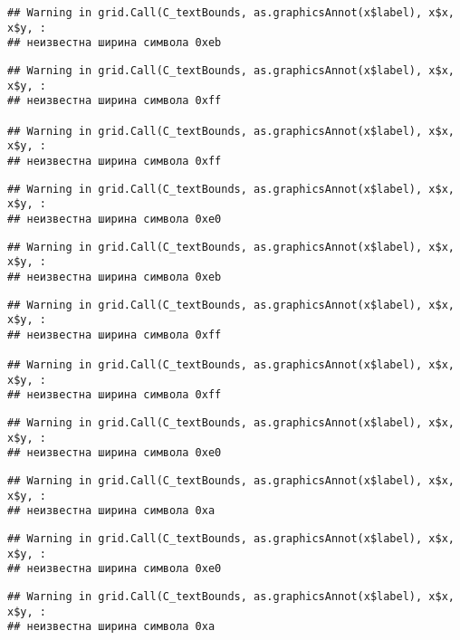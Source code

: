 \documentclass[
]{article}
\begin{document}
\begin{verbatim}
## Warning in grid.Call(C_textBounds, as.graphicsAnnot(x$label), x$x, x$y, :
## неизвестна ширина символа 0xeb
\end{verbatim}

\begin{verbatim}
## Warning in grid.Call(C_textBounds, as.graphicsAnnot(x$label), x$x, x$y, :
## неизвестна ширина символа 0xff

## Warning in grid.Call(C_textBounds, as.graphicsAnnot(x$label), x$x, x$y, :
## неизвестна ширина символа 0xff
\end{verbatim}

\begin{verbatim}
## Warning in grid.Call(C_textBounds, as.graphicsAnnot(x$label), x$x, x$y, :
## неизвестна ширина символа 0xe0
\end{verbatim}

\begin{verbatim}
## Warning in grid.Call(C_textBounds, as.graphicsAnnot(x$label), x$x, x$y, :
## неизвестна ширина символа 0xeb
\end{verbatim}

\begin{verbatim}
## Warning in grid.Call(C_textBounds, as.graphicsAnnot(x$label), x$x, x$y, :
## неизвестна ширина символа 0xff

## Warning in grid.Call(C_textBounds, as.graphicsAnnot(x$label), x$x, x$y, :
## неизвестна ширина символа 0xff
\end{verbatim}

\begin{verbatim}
## Warning in grid.Call(C_textBounds, as.graphicsAnnot(x$label), x$x, x$y, :
## неизвестна ширина символа 0xe0
\end{verbatim}

\begin{verbatim}
## Warning in grid.Call(C_textBounds, as.graphicsAnnot(x$label), x$x, x$y, :
## неизвестна ширина символа 0xa
\end{verbatim}

\begin{verbatim}
## Warning in grid.Call(C_textBounds, as.graphicsAnnot(x$label), x$x, x$y, :
## неизвестна ширина символа 0xe0
\end{verbatim}

\begin{verbatim}
## Warning in grid.Call(C_textBounds, as.graphicsAnnot(x$label), x$x, x$y, :
## неизвестна ширина символа 0xa
\end{verbatim}
\end{document}
